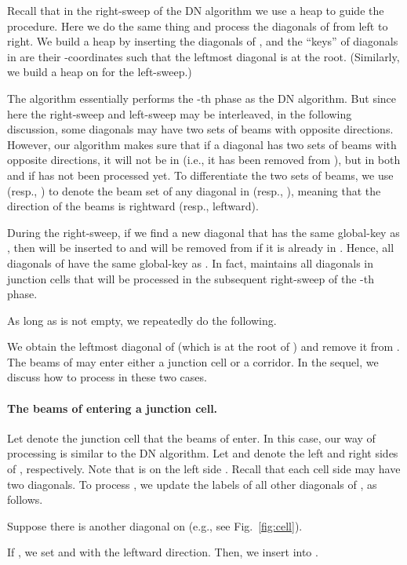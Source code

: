 \documentclass[english,runningheads,11pt]{llncs-revised}
\begin{document}
Recall that in the right-sweep of the DN algorithm we use a heap
 to guide the procedure. Here we do the same thing and
process the diagonals of  from left to right.
We build a heap  by inserting the diagonals of , and the
``keys'' of diagonals in  are
their -coordinates such that the leftmost diagonal is at the root.
(Similarly, we build a heap  on  for the left-sweep.)



The algorithm essentially performs the -th phase as the DN
algorithm. But since here the right-sweep and left-sweep may be
interleaved, in the following discussion, some diagonals may have two
sets of beams with opposite directions. However, our algorithm makes
sure that if a diagonal  has
two sets of beams with opposite directions, it will not be in
 (i.e., it has been removed from ), but in both  and 
if  has not been processed yet.
To differentiate the two sets of beams, we use  (resp., ) to denote the beam set of any diagonal  in  (resp., ), meaning that the direction of
the beams is rightward (resp., leftward).


During the right-sweep, if we find a new diagonal  that has the same global-key as , then  will be inserted to  and  will be removed from  if it is already in . Hence, all diagonals of  have the same global-key as . In fact,  maintains all diagonals in junction cells that will be processed in the subsequent right-sweep of the -th phase.

As long as  is not empty, we repeatedly do the following.

We obtain the leftmost diagonal  of  (which is at the root of )
and remove it from . The beams of  may
enter either a junction cell or a corridor. In the sequel,
we discuss how to process  in these two cases.

\paragraph{The beams of  entering a junction cell.}
Let  denote the junction cell that the beams of  enter.
In this case, our way of processing  is similar to
the DN algorithm. Let  and  denote the left and
right sides of , respectively. Note that  is on the left side
. Recall that each cell side may have two diagonals. To process
, we update the labels of all other diagonals of , as
follows.

Suppose there is another diagonal  on  (e.g., see Fig.~\ref{fig:cell}).

If , we set  and
 with the leftward direction. Then, we insert  into
.
\end{document}

